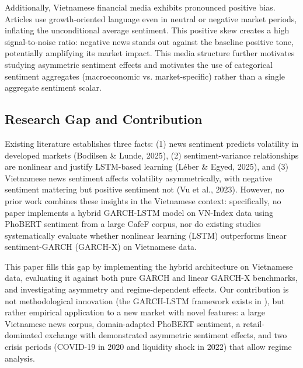 Additionally, Vietnamese financial media exhibits pronounced positive bias. Articles use growth-oriented language even in neutral or negative market periods, inflating the unconditional average sentiment. This positive skew creates a high signal-to-noise ratio: negative news stands out against the baseline positive tone, potentially amplifying its market impact. This media structure further motivates studying asymmetric sentiment effects and motivates the use of categorical sentiment aggregates (macroeconomic vs. market-specific) rather than a single aggregate sentiment scalar.

\subsection{Research Gap and Contribution}

Existing literature establishes three facts: (1) news sentiment predicts volatility in developed markets (Bodilsen \& Lunde, 2025), (2) sentiment-variance relationships are nonlinear and justify LSTM-based learning (Léber \& Egyed, 2025), and (3) Vietnamese news sentiment affects volatility asymmetrically, with negative sentiment mattering but positive sentiment not (Vu et al., 2023). However, no prior work combines these insights in the Vietnamese context: specifically, no paper implements a hybrid GARCH-LSTM model on VN-Index data using PhoBERT sentiment from a large CafeF corpus, nor do existing studies systematically evaluate whether nonlinear learning (LSTM) outperforms linear sentiment-GARCH (GARCH-X) on Vietnamese data.

This paper fills this gap by implementing the hybrid architecture on Vietnamese data, evaluating it against both pure GARCH and linear GARCH-X benchmarks, and investigating asymmetry and regime-dependent effects. Our contribution is not methodological innovation (the GARCH-LSTM framework exists in \citet{leber2025nonlinear}), but rather empirical application to a new market with novel features: a large Vietnamese news corpus, domain-adapted PhoBERT sentiment, a retail-dominated exchange with demonstrated asymmetric sentiment effects, and two crisis periods (COVID-19 in 2020 and liquidity shock in 2022) that allow regime analysis.
